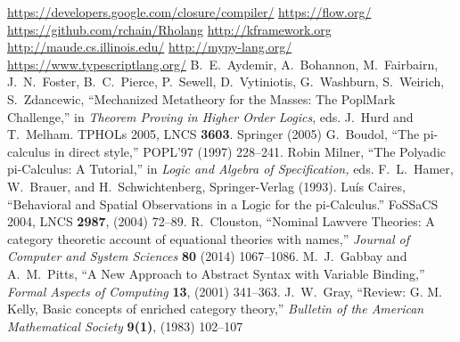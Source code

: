\documentclass[submission,copyright,creativecommons]{eptcs}
\begin{document}
\begin{thebibliography}{99}

\newcommand{\quantph}[1]{\href{http://arxiv.org/abs/quant-ph/#1}{{ arXiv:quant-ph/#1}}}
\newcommand{\hepth}[1]{\href{http://arxiv.org/abs/hep-th/#1}{{ arXiv:hep-th/#1}}}
\newcommand{\grqc}[1]{\href{http://arxiv.org/abs/gr-qc/#1}{{ arXiv:gr-qc/#1}}}
\newcommand{\qalg}[1]{\href{http://arxiv.org/abs/q-alg/#1}{{ arXiv:q-alg/#1}}}
\newcommand{\mathph}[1]{\href{http://arxiv.org/abs/math-ph/#1}{{ arXiv:math-ph/#1}}}
\newcommand{\Math}[1]{\href{http://arxiv.org/abs/math/#1}{{ arXiv:math/#1}}}
\newcommand{\arxiv}[1]{\href{http://arxiv.org/abs/#1}{{ arXiv:#1}}}

 \href{https://developers.google.com/closure/compiler/}{https://developers.google.com/closure/compiler/}
 \href{https://flow.org/}{https://flow.org/}
 \href{https://github.com/rchain/Rholang}{https://github.com/rchain/Rholang}
 \href{http://kframework.org}{http://kframework.org}
 \href{http://maude.cs.illinois.edu/}{http://maude.cs.illinois.edu/}
 \href{http://mypy-lang.org/}{http://mypy-lang.org/}
 \href{https://www.typescriptlang.org/}{https://www.typescriptlang.org/}
 B.\ E.\ Aydemir, A.\ Bohannon, M.\ Fairbairn, J.\ N.\ Foster, B.\ C.\ Pierce, P.\ Sewell, D.\ Vytiniotis, G.\ Washburn, S.\ Weirich, S.\ Zdancewic, ``Mechanized Metatheory for the Masses: The PoplMark Challenge,'' in {\em Theorem Proving in Higher Order Logics}, eds. J.\ Hurd and T.\ Melham. TPHOLs 2005, LNCS {\bf 3603}. Springer (2005)
 G.\ Boudol, ``The pi-calculus in direct style,'' POPL'97 (1997) 228--241.
 Robin Milner, ``The Polyadic {pi-Calculus}: A Tutorial,'' in {\em Logic and Algebra of Specification,} eds. F.\ L.\ Hamer, W.\ Brauer, and H.\ Schwichtenberg, Springer-Verlag (1993).
 Lu\'is Caires, ``Behavioral and Spatial Observations in a Logic for the pi-Calculus.''  FoSSaCS 2004, LNCS {\bf 2987}, (2004) 72--89.
 R.\ Clouston, ``Nominal Lawvere Theories: A category theoretic account of equational theories with names,'' {\em Journal of Computer and System Sciences} {\bf 80} (2014) 1067--1086.
 M.\ J.\ Gabbay and A.\ M.\ Pitts, ``A New Approach to Abstract Syntax with Variable Binding,'' {\em Formal Aspects of Computing} {\bf 13}, (2001) 341--363.
 J.\ W.\ Gray, ``Review: G. M. Kelly, Basic concepts of enriched category theory,'' {\em Bulletin of the American Mathematical Society} {\bf 9(1)}, (1983) 102--107 

\end{thebibliography}
\end{document}
